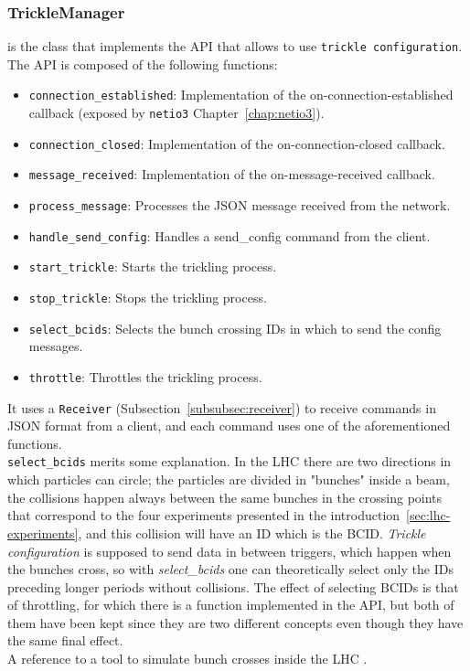 \subsubsection{TrickleManager} is the class that implements the \acs{API} that allows to use \texttt{trickle configuration}. The \acs{API} is composed of the following functions:
\begin{itemize}
    \item \texttt{connection\_established}: Implementation of the on-connection-established callback (exposed by \texttt{netio3} Chapter~\ref{chap:netio3}). 
    \item \texttt{connection\_closed}: Implementation of the on-connection-closed callback.
    \item \texttt{message\_received}: Implementation of the on-message-received callback.
    \item \texttt{process\_message}: Processes the JSON message received from the network.
    \item \texttt{handle\_send\_config}: Handles a send\_config command from the client. 
    \item \texttt{start\_trickle}: Starts the trickling process.
    \item \texttt{stop\_trickle}: Stops the trickling process.
    \item \texttt{select\_bcids}: Selects the bunch crossing IDs in which to send the config messages.
    \item \texttt{throttle}: Throttles the trickling process.
\end{itemize}

It uses a \texttt{Receiver} (Subsection~\ref{subsubsec:receiver}) to receive commands in JSON format from a client, and each command uses one of the aforementioned functions.\\

\texttt{select\_bcids} merits some explanation. In the \acl{LHC} there are two directions in which particles can circle; the particles are divided in "bunches" inside a beam, the collisions happen always between the same bunches in the crossing points that correspond to the four experiments presented in the introduction~\ref{sec:lhc-experiments}, and this collision will have an ID which is the \acl{BCID}. \emph{Trickle configuration} is supposed to send data in between triggers, which happen when the bunches cross, so with \emph{select\_bcids} one can theoretically select only the IDs preceding longer periods without collisions. The effect of selecting \acs{BCID}s is that of throttling, for which there is a function implemented in the \acs{API}, but both of them have been kept since they are two different concepts even though they have the same final effect.\\
A reference to a tool to simulate bunch crosses inside the \acs{LHC} \cite{bunch-crossing-tool}.

